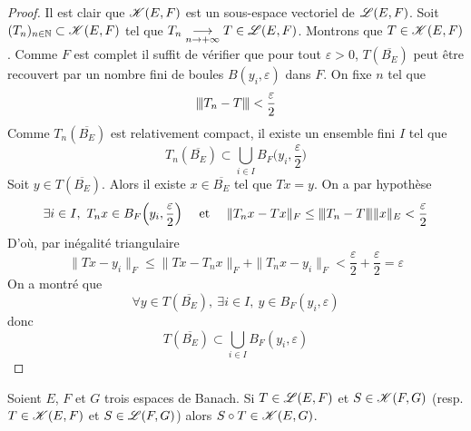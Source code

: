 \begin{proof}
    Il est clair que $\mathscr{K}(E,F)$ est un sous-espace vectoriel de $\mathscr{L}(E,F)$. Soit $(T_n)_{n \in \mathbb{N}} \subset \mathscr{K}(E,F)$ tel que $T_n \underset{n \to +\infty}{\longrightarrow} T \in \mathscr{L}(E,F)$. Montrons que $T \in \mathscr{K}(E,F)$. Comme $F$ est complet il suffit de vérifier que pour tout $\varepsilon >0$, $T(\overline{B_E})$ peut être recouvert par un nombre fini de boules $B(y_i,\varepsilon)$ dans $F$. On fixe $n$ tel que 
    \begin{equation*}
        {\left\vert\kern-0.25ex\left\vert \kern-0.25ex\left\vert T_n-T \right\vert\kern-0.25ex\right\vert\kern-0.25ex\right\vert} < \frac{\varepsilon}{2}
    \end{equation*}
    Comme $T_n(\overline{B_E})$ est relativement compact, il existe un ensemble fini $I$ tel que 
    \begin{equation*}
        T_n(\overline{B_E}) \subset \bigcup_{i \in I}B_F\Big(y_i, \frac{\varepsilon}{2}\Big)
    \end{equation*}
    Soit $y \in T(\overline{B_E})$. Alors il existe $x \in \overline{B_E}$ tel que $Tx = y$. On a par hypothèse
    \begin{eqnarray*}
        \exists i \in I, \ T_nx \in B_F\Big(y_i,\frac{\varepsilon}{2}\Big) \ \ \ &\text{ et }& \|T_nx-Tx\|_F \leq {\left\vert\kern-0.25ex\left\vert \kern-0.25ex\left\vert T_n-T \right\vert\kern-0.25ex\right\vert\kern-0.25ex\right\vert}\|x\|_E < \frac{\varepsilon}{2}
    \end{eqnarray*}
    D'où, par inégalité triangulaire 
    \begin{equation*}
        \|Tx-y_i\|_F \leq \|Tx-T_nx\|_F + \|T_nx-y_i\|_F < \frac{\varepsilon}{2}+\frac{\varepsilon}{2}=\varepsilon
    \end{equation*}
    On a montré que 
    \begin{equation*}
        \forall y \in T(\overline{B_E}), \ \exists i \in I, \ y \in B_F(y_i,\varepsilon)
    \end{equation*}
    donc
    \begin{equation*}
        T(\overline{B_E}) \subset \bigcup_{i\in I} B_F(y_i,\varepsilon)
    \end{equation*}
\end{proof}

\begin{proposition}\label{prop_produit_compact_borne}
    Soient $E$, $F$ et $G$ trois espaces de Banach. Si $T \in \mathscr{L}(E,F)$ et $S \in \mathscr{K}(F,G)$ (resp. $T \in \mathscr{K}(E,F)$ et $S \in \mathscr{L}(F,G)$) alors $S \circ T \in \mathscr{K}(E,G)$.
\end{proposition}

